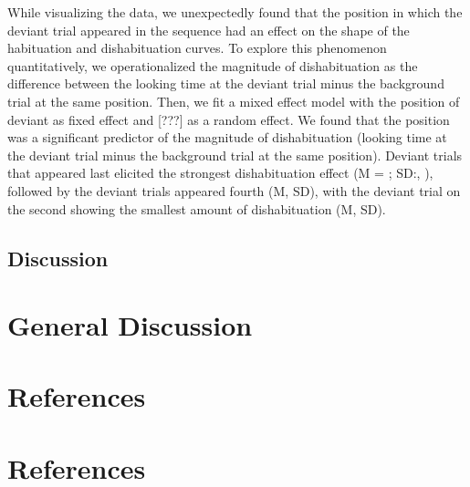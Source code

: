 \documentclass[10pt, letterpaper]{article}
\begin{document}
While visualizing the data, we unexpectedly found that the position in which the deviant trial appeared in the sequence had an effect on the shape of the habituation and dishabituation curves. To explore this phenomenon quantitatively, we operationalized the magnitude of dishabituation as the difference between the looking time at the deviant trial minus the background trial at the same position. Then, we fit a mixed effect model with the position of deviant as fixed effect and {[}???{]} as a random effect. We found that the position was a significant predictor of the magnitude of dishabituation (looking time at the deviant trial minus the background trial at the same position). Deviant trials that appeared last elicited the strongest dishabituation effect (M = ; SD:, ), followed by the deviant trials appeared fourth (M, SD), with the deviant trial on the second showing the smallest amount of dishabituation (M, SD).

\hypertarget{discussion}{%
\subsection{Discussion}\label{discussion}}

\hypertarget{general-discussion}{%
\section{General Discussion}\label{general-discussion}}

\hypertarget{references}{%
\section{References}\label{references}}

\hypertarget{references-1}{%
\section{References}\label{references-1}}

\setlength{\parindent}{-0.1in} 
\setlength{\leftskip}{0.125in}

\noindent
\end{document}
